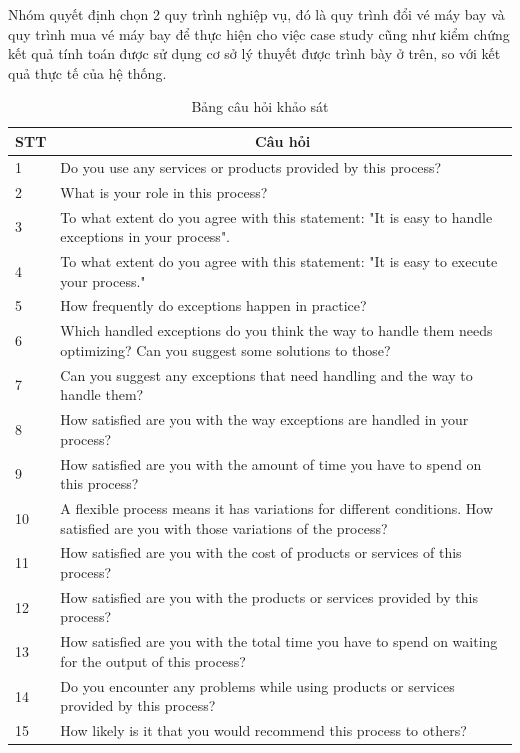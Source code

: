 Nhóm quyết định chọn 2 quy trình nghiệp vụ, đó là quy trình đổi vé máy bay và quy trình mua vé máy bay để thực hiện cho việc case study cũng như kiểm chứng
kết quả tính toán được sử dụng cơ sở lý thuyết được trình bày ở trên, so với kết quả thực tế của hệ thống.
\begin{center}
    \begin{table}[H]
        \begin{tabular}{|p{2cm}|p{12cm}|}
        \hline
        \textbf{STT} & \multicolumn{1}{c|}{\textbf{Câu hỏi}} \\ \hline
        1 & Do you use any services or products provided by this process? \\ \hline
        2 & What is your role in this process? \\ \hline
        3 & To what extent do you agree with this statement: "It is easy to handle exceptions in your process". \\ \hline
        4 & To what extent do you agree with this statement: "It is easy to execute your process." \\ \hline
        5 & How frequently do exceptions happen in practice? \\ \hline
        6 & Which handled exceptions do you think the way to handle them needs optimizing? Can you suggest some solutions to those? \\ \hline
        7 & Can you suggest any exceptions that need handling and the way to handle them? \\ \hline
        8 & How satisfied are you with the way exceptions are handled in your process? \\ \hline
        9 & How satisfied are you with the amount of time you have to spend on this process? \\ \hline
        10 & A flexible process means it has variations for different conditions. How satisfied are you with those variations of the process? \\ \hline
        11 & How satisfied are you with the cost of products or services of this process? \\ \hline
        12 & How satisfied are you with the products or services provided by this process? \\ \hline
        13 & How satisfied are you with the total time you have to spend on waiting for the output of this process? \\ \hline
        14 & Do you encounter any problems while using products or services provided by this process? \\ \hline
        15 & How likely is it that you would recommend this process to others? \\ \hline
        \end{tabular}
        \vspace{0.5cm}
        \caption{Bảng câu hỏi khảo sát}
        \end{table}
\end{center}
